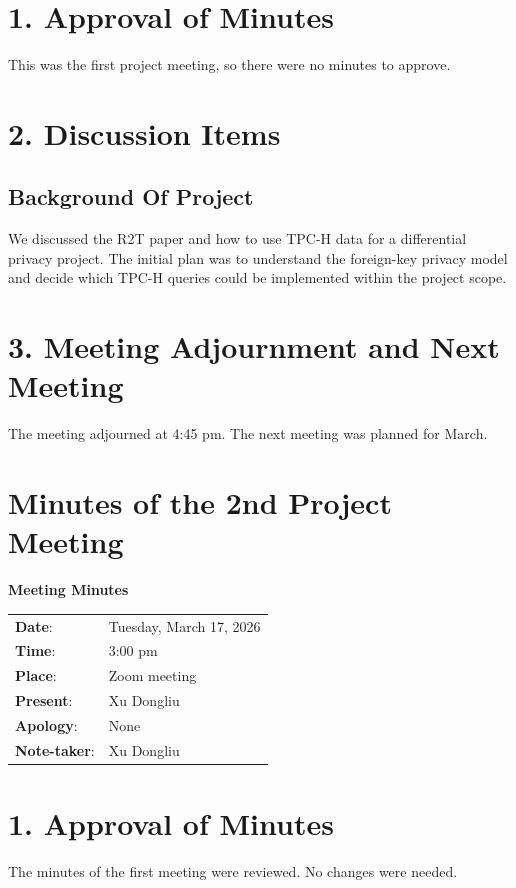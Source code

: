 \documentclass[12pt,a4paper]{report}
\begin{document}
\section*{1. Approval of Minutes}
This was the first project meeting, so there were no minutes to approve.

\section*{2. Discussion Items}
\subsection*{Background Of Project}
We discussed the R2T paper and how to use TPC-H data for a differential
privacy project. The initial plan was to understand the foreign-key
privacy model and decide which TPC-H queries could be implemented within
the project scope.

\section*{3. Meeting Adjournment and Next Meeting}
The meeting adjourned at 4:45 pm. The next meeting was planned for March.

\newpage

\section{Minutes of the 2nd Project Meeting}
\begin{center}
\textbf{Meeting Minutes}
\end{center}

\begin{tabular}{ll}
\textbf{Date}: & Tuesday, March 17, 2026 \\
\textbf{Time}: & 3:00 pm \\
\textbf{Place}: & Zoom meeting \\
\textbf{Present}: & Xu Dongliu \\
\textbf{Apology}: & None \\
\textbf{Note-taker}: & Xu Dongliu \\
\end{tabular}

\section*{1. Approval of Minutes}
The minutes of the first meeting were reviewed. No changes were needed.
\end{document}
